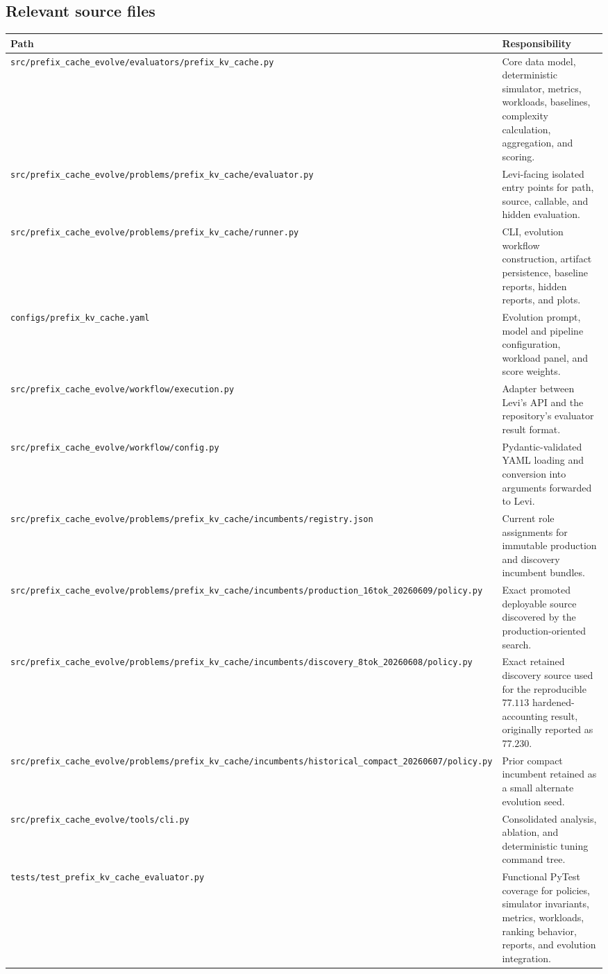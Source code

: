 \documentclass[11pt]{article}
\newcommand{\code}[1]{\texttt{\detokenize{#1}}}
\newcommand{\filepath}[1]{\nolinkurl{#1}}
\begin{document}
\subsection{Relevant source files}

\begin{longtable}{>{\raggedright\arraybackslash}p{}
                  >{\raggedright\arraybackslash}p{}}
\toprule
\textbf{Path} & \textbf{Responsibility} \\
\midrule
\endhead
\filepath{src/prefix_cache_evolve/evaluators/prefix_kv_cache.py} &
Core data model, deterministic simulator, metrics, workloads, baselines, complexity
calculation, aggregation, and scoring. \\
\filepath{src/prefix_cache_evolve/problems/prefix_kv_cache/evaluator.py} &
Levi-facing isolated entry points for path, source, callable, and hidden evaluation. \\
\filepath{src/prefix_cache_evolve/problems/prefix_kv_cache/runner.py} &
CLI, evolution workflow construction, artifact persistence, baseline reports, hidden
reports, and plots. \\
\filepath{configs/prefix_kv_cache.yaml} &
Evolution prompt, model and pipeline configuration, workload panel, and score weights. \\
\filepath{src/prefix_cache_evolve/workflow/execution.py} &
Adapter between Levi's \code{evolve_code} API and the repository's evaluator result
format. \\
\filepath{src/prefix_cache_evolve/workflow/config.py} &
Pydantic-validated YAML loading and conversion into arguments forwarded to Levi. \\
\filepath{src/prefix_cache_evolve/problems/prefix_kv_cache/incumbents/registry.json} &
Current role assignments for immutable production and discovery incumbent bundles. \\
\filepath{src/prefix_cache_evolve/problems/prefix_kv_cache/incumbents/production_16tok_20260609/policy.py} &
Exact promoted deployable source discovered by the production-oriented search. \\
\filepath{src/prefix_cache_evolve/problems/prefix_kv_cache/incumbents/discovery_8tok_20260608/policy.py} &
Exact retained discovery source used for the reproducible \(77.113\)
hardened-accounting result, originally reported as \(77.230\). \\
\filepath{src/prefix_cache_evolve/problems/prefix_kv_cache/incumbents/historical_compact_20260607/policy.py} &
Prior compact incumbent retained as a small alternate evolution seed. \\
\filepath{src/prefix_cache_evolve/tools/cli.py} &
Consolidated analysis, ablation, and deterministic tuning command tree. \\
\filepath{tests/test_prefix_kv_cache_evaluator.py} &
Functional PyTest coverage for policies, simulator invariants, metrics, workloads,
ranking behavior, reports, and evolution integration. \\
\bottomrule
\end{longtable}
\end{document}
